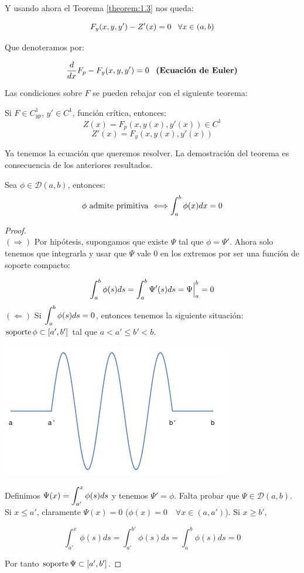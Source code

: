 Y usando ahora el Teorema \ref{theorem:1.3} nos queda:

\[
F_y(x,y,y')-Z'(x)=0 \;\;\; \forall x \in(a,b)
\]

Que denoteramos por:

\[
\frac{d}{dx}F_p-F_y(x,y,y')=0 \;\;\; \textbf{(Ecuación de Euler)}
\]

Las condiciones sobre $F$ se pueden rebajar con el siguiente teorema:

\begin{theorem} 
\label{theorem:12}
Si $F\in C^1_{yp}$, $y'\in C^1$, función crítica, entonces:
\[
Z(x)=F_p(x,y(x),y'(x))\in C^1
\]
\[
Z'(x)=F_y(x,y(x),y'(x))
\]

\end{theorem}

Ya tenemos la ecuación que queremos resolver. La demostración del teorema es consecuencia de los anteriores resultados.

\begin{lemma}
\label{lemma:13}
Sea $\phi\in\mathcal{D}(a,b)$, entonces:
\[
\phi \text{ admite primitiva } \Longleftrightarrow \displaystyle\int_{ a }^{ b } \phi(x)dx=0
\]
\end{lemma}

\begin{proof}
\hfill\\
$(\Rightarrow)$ Por hipótesis, supongamos que existe $\Psi$ tal que $\phi=\Psi'$. Ahora solo tenemos que integrarla y usar que $\Psi$ vale 0 en los extremos por ser una función de soporte compacto:

\[
\displaystyle\int_{ a }^{ b } \phi(s)ds=\displaystyle\int_{ a }^{ b } \Psi'(s)ds=\Psi\Big|_a^b=0
\]
$(\Leftarrow)$  Si $\displaystyle\int_{ a }^{ b } \phi(s)ds=0$, entonces tenemos la siguiente situación: $\operatorname{soporte}\phi\subset[a',b']$ tal que $a<a'\leq b'<b$.

\begin{center}
\includegraphics[scale=0.4]{./img/testfuncion.png}
\end{center}

Definimos $\Psi(x)=\displaystyle\int_{ a' }^{ x } \phi(s)ds$ y tenemos $\Psi'=\phi$. Falta probar que $\Psi\in\mathcal{D}(a,b)$.
Si $x\leq a'$, claramente $\Psi(x)=0$ \big($\phi(x)=0\quad\forall x\in(a,a')$\big). Si $x\geq b'$,

\[
\int_{a'}^x\phi(s)ds=\int_{a'}^{b'}\phi(s)ds=\int_{a}^{b}\phi(s)ds=0
\]

Por tanto $\operatorname{soporte}\Psi\subset[a',b']$.

\end{proof}


